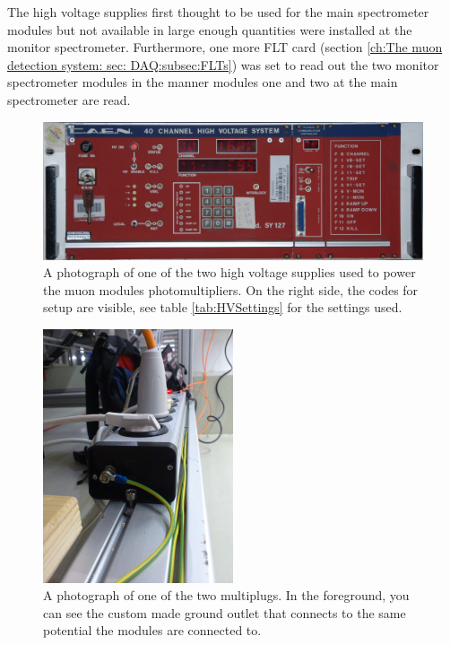   The high voltage supplies first thought to be used for the main spectrometer modules but not available in large enough quantities were installed at the monitor spectrometer. Furthermore, one more FLT card (section \ref{ch:The muon detection system: sec: DAQ:subsec:FLTs}) was set to read out the two monitor spectrometer modules in the manner modules one and two at the main spectrometer are read.

  \begin{figure}
  \centering
  
  	\includegraphics[width = \textwidth]{graphics/muonModules/mainSpec/HV.jpg}
  \caption[High voltage supplies]{A photograph of one of the two high voltage supplies used to power the muon modules photomultipliers. On the right side, the codes for setup are visible, see table \ref{tab:HVSettings} for the settings used.}
  \label{fig:HV}
  \end{figure}

  \begin{figure}
  \centering
  
  	\includegraphics[angle = 90, width = 0.5\textwidth]{graphics/muonModules/mainSpec/multiplug.jpg}
  \caption[Grounded multiplug]{A photograph of one of the two multiplugs. In the foreground, you can see the custom made ground outlet that connects to the same potential the modules are connected to.}
  \label{fig:multiplug}
  \end{figure}


